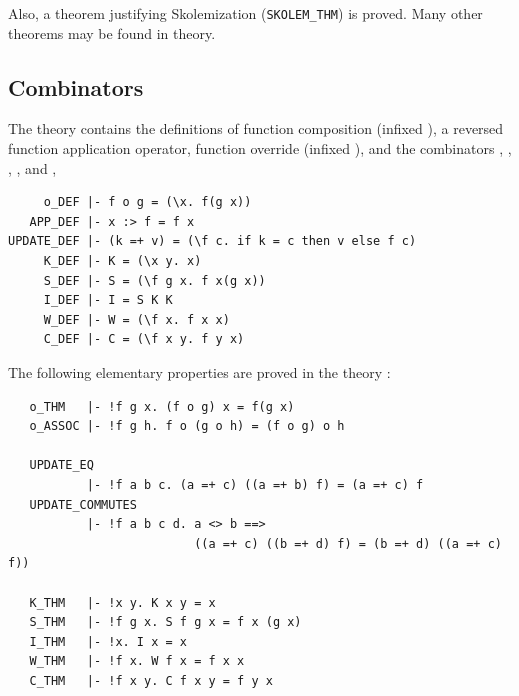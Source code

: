 Also, a theorem justifying Skolemization ({\small\verb+SKOLEM_THM+}) is
proved. Many other theorems may be found in  theory.


\subsection{Combinators}
\label{sec:combinTheory}


The theory 
contains the definitions of function composition (infixed ),
a reversed function application operator,
function override (infixed \ml{=+}),
and the combinators
,
,
,
,
and ,

\begin{hol}
\begin{verbatim}
     o_DEF |- f o g = (\x. f(g x))
   APP_DEF |- x :> f = f x
UPDATE_DEF |- (k =+ v) = (\f c. if k = c then v else f c)
     K_DEF |- K = (\x y. x)
     S_DEF |- S = (\f g x. f x(g x))
     I_DEF |- I = S K K
     W_DEF |- W = (\f x. f x x)
     C_DEF |- C = (\f x y. f y x)
\end{verbatim}
\end{hol}

\noindent The following elementary properties are proved in the theory
:

\begin{hol}
\begin{verbatim}
   o_THM   |- !f g x. (f o g) x = f(g x)
   o_ASSOC |- !f g h. f o (g o h) = (f o g) o h

   UPDATE_EQ
           |- !f a b c. (a =+ c) ((a =+ b) f) = (a =+ c) f
   UPDATE_COMMUTES
           |- !f a b c d. a <> b ==>
                          ((a =+ c) ((b =+ d) f) = (b =+ d) ((a =+ c) f))

   K_THM   |- !x y. K x y = x
   S_THM   |- !f g x. S f g x = f x (g x)
   I_THM   |- !x. I x = x
   W_THM   |- !f x. W f x = f x x
   C_THM   |- !f x y. C f x y = f y x
\end{verbatim}
\end{hol}

